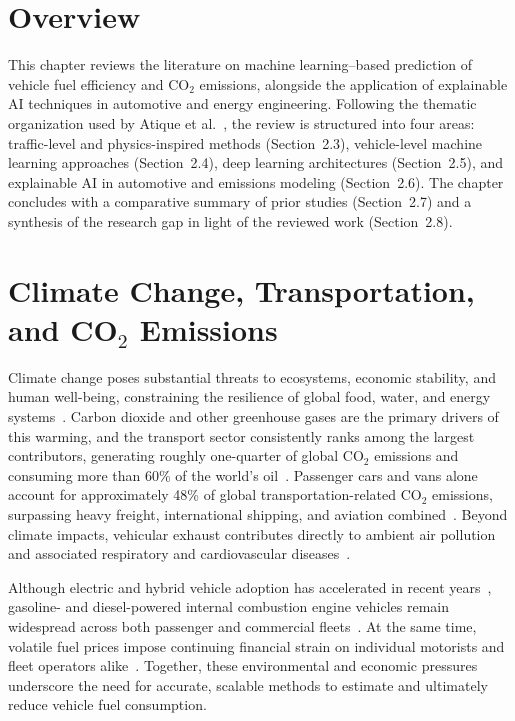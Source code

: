\section{Overview}

This chapter reviews the literature on machine learning--based prediction of vehicle fuel efficiency and CO$_2$ emissions, alongside the application of explainable AI techniques in automotive and energy engineering. Following the thematic organization used by Atique et al.~\cite{atique2026explainable}, the review is structured into four areas: traffic-level and physics-inspired methods (Section~2.3), vehicle-level machine learning approaches (Section~2.4), deep learning architectures (Section~2.5), and explainable AI in automotive and emissions modeling (Section~2.6). The chapter concludes with a comparative summary of prior studies (Section~2.7) and a synthesis of the research gap in light of the reviewed work (Section~2.8).

\section{Climate Change, Transportation, and CO$_2$ Emissions}

Climate change poses substantial threats to ecosystems, economic stability, and human well-being, constraining the resilience of global food, water, and energy systems~\cite{atique2026explainable}\cite{schleussner2016differential}. Carbon dioxide and other greenhouse gases are the primary drivers of this warming, and the transport sector consistently ranks among the largest contributors, generating roughly one-quarter of global CO$_2$ emissions and consuming more than 60\% of the world's oil~\cite{atique2026explainable}\cite{johnson2010review}\cite{florini2011international}. Passenger cars and vans alone account for approximately 48\% of global transportation-related CO$_2$ emissions, surpassing heavy freight, international shipping, and aviation combined~\cite{atique2026explainable}\cite{huh2023oh}. Beyond climate impacts, vehicular exhaust contributes directly to ambient air pollution and associated respiratory and cardiovascular diseases~\cite{atique2026explainable}\cite{eren2024predicting}\cite{world2026health}.

Although electric and hybrid vehicle adoption has accelerated in recent years~\cite{coffman2017electric}, gasoline- and diesel-powered internal combustion engine vehicles remain widespread across both passenger and commercial fleets~\cite{park2023development}. At the same time, volatile fuel prices impose continuing financial strain on individual motorists and fleet operators alike~\cite{atique2026explainable}. Together, these environmental and economic pressures underscore the need for accurate, scalable methods to estimate and ultimately reduce vehicle fuel consumption.


